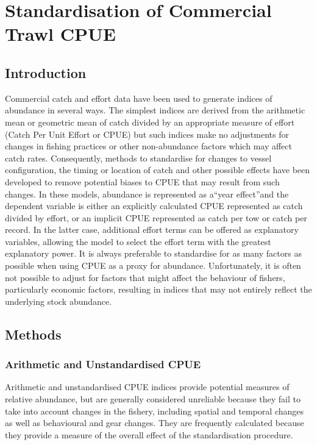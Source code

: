 
\clearpage

\chapter{Standardisation of Commercial Trawl CPUE}

\section{Introduction}

Commercial catch and effort data have been used to generate indices of abundance in several ways. The simplest indices are derived from the arithmetic mean or geometric mean of catch divided by an appropriate measure of effort (Catch Per Unit Effort or CPUE) but such indices make no adjustments for changes in fishing practices or other non-abundance factors which may affect catch rates. Consequently, methods to standardise for changes to vessel configuration, the timing or location of catch and other possible effects have been developed to remove potential biases to CPUE that may result from such changes. In these models, abundance is represented as a“year effect”and the dependent variable is either an explicitly calculated CPUE represented as catch divided by effort, or an implicit CPUE represented as catch per tow or catch per record. In the latter case, additional effort terms can be offered as explanatory variables, allowing the model to select the effort term with the greatest explanatory power. It is always preferable to standardise for as many factors as possible when using CPUE as a proxy for abundance. Unfortunately, it is often not possible to adjust for factors that might affect the behaviour of fishers, particularly economic factors, resulting in indices that may not entirely reflect the underlying stock abundance.

\section{Methods}
\subsection{Arithmetic and Unstandardised CPUE}

Arithmetic and unstandardised CPUE indices provide potential measures of relative abundance, but are generally considered unreliable because they fail to take into account changes in the fishery, including spatial and temporal changes as well as behavioural and gear changes. They are frequently calculated because they provide a measure of the overall effect of the standardisation procedure.

